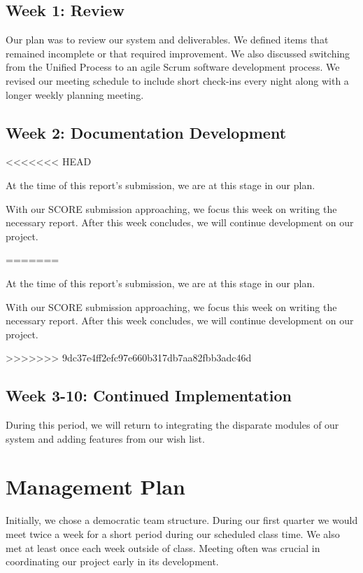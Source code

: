 \documentclass[12pt]{article}
\begin{document}
\begin{enumerate}
\begin{enumerate}
\subsection*{Week 1: Review}

Our plan was to review our system and deliverables. We defined items that remained incomplete or that required improvement. We also discussed switching from the Unified Process to an agile Scrum software development process. We revised our meeting schedule to include short check-ins every night along with a longer weekly planning meeting. 

\subsection*{Week 2: Documentation Development}
<<<<<<< HEAD

At the time of this report's submission, we are at this stage in our plan.

With our SCORE submission approaching, we focus this week on writing the necessary report. After this week concludes, we will continue development on our project.

=======

At the time of this report's submission, we are at this stage in our plan.

With our SCORE submission approaching, we focus this week on writing the necessary report. After this week concludes, we will continue development on our project.

>>>>>>> 9dc37e4ff2efc97e660b317db7aa82fbb3adc46d
\subsection*{Week 3-10: Continued Implementation}

During this period, we will return to integrating the disparate modules of our system and adding features from our wish list.

\section{Management Plan} %

Initially, we chose a democratic team structure. During our first quarter we would meet twice a week for a short period during our scheduled class time. We also met at least once each week outside of class. Meeting often was crucial in coordinating our project early in its development. 


\end{enumerate}
\end{enumerate}
\end{document}
